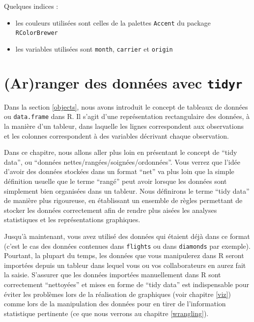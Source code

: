 \documentclass[a4paperpaper,]{article}
\providecommand{\tightlist}{%
  \setlength{\itemsep}{0pt}\setlength{\parskip}{0pt}}
\theoremstyle{definition}
\theoremstyle{definition}
\theoremstyle{definition}
\theoremstyle{remark}
\begin{document}
Quelques indices :

\begin{itemize}
\tightlist
\item
  les couleurs utilisées sont celles de la palettes \texttt{Accent} du
  package \texttt{RColorBrewer}
\item
  les variables utilisées sont \texttt{month}, \texttt{carrier} et
  \texttt{origin}
\end{itemize}

\hypertarget{tidyr}{%
\section{\texorpdfstring{(Ar)ranger des données avec
\texttt{tidyr}}{(Ar)ranger des données avec tidyr}}\label{tidyr}}

Dans la section \ref{objects}, nous avons introduit le concept de
tableaux de données ou \texttt{data.frame} dans R. Il s'agit d'une
représentation rectangulaire des données, à la manière d'un tableur,
dans laquelle les lignes correspondent aux observations et les colonnes
correspondent à des variables décrivant chaque observation.

Dans ce chapitre, nous allons aller plus loin en présentant le concept
de ``tidy data'', ou ``données nettes/rangées/soignées/ordonnées''. Vous
verrez que l'idée d'avoir des données stockées dans un format ``net'' va
plus loin que la simple définition usuelle que le terme ``rangé'' peut
avoir lorsque les données sont simplement bien organisées dans un
tableur. Nous définirons le terme ``tidy data'' de manière plus
rigoureuse, en établissant un ensemble de règles permettant de stocker
les données correctement afin de rendre plus aisées les analyses
statistiques et les représentations graphiques.

Jusqu'à maintenant, vous avez utilisé des données qui étaient déjà dans
ce format (c'est le cas des données contenues dans \texttt{flights} ou
dans \texttt{diamonds} par exemple). Pourtant, la plupart du temps, les
données que vous manipulerez dans R seront importées depuis un tableur
dans lequel vous ou vos collaborateurs en aurez fait la saisie.
S'assurer que les données importées manuellement dans R sont
correctement ``nettoyées'' et mises en forme de ``tidy data'' est
indispensable pour éviter les problèmes lors de la réalisation de
graphiques (voir chapitre \ref{viz}) comme lors de la manipulation des
données pour en tirer de l'information statistique pertinente (ce que
nous verrons au chapitre \ref{wrangling}).
\end{document}

